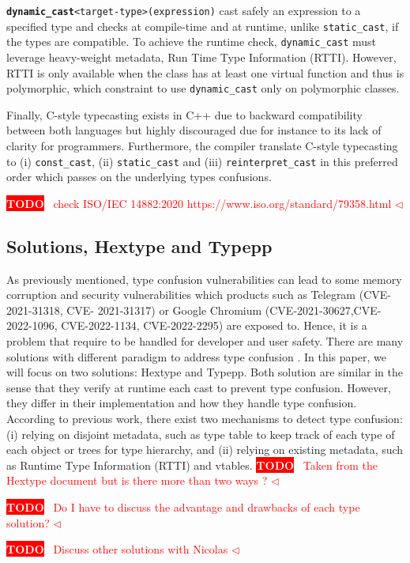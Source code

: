 \documentclass[a4paper,11pt,oneside]{report}
\newcommand{\todobox}[3]{%
       \colorbox{#1}{\textcolor{white}{\sffamily\bfseries\scriptsize #2}}%
       ~\textcolor{#1}{#3} %
       \textcolor{#1}{$\triangleleft$}%
}
\newcommand{\adrbqt}[1]{\todobox{red}{TODO}{#1}}
\begin{document}
\texttt{\textbf{dynamic\_cast}<target-type>(expression)} cast safely an expression to a specified type and checks at compile-time and at runtime, unlike \texttt{static\_cast}, if the types are compatible. 
To achieve the runtime check, \texttt{dynamic\_cast} must leverage heavy-weight metadata, Run Time Type Information (RTTI). However, RTTI is only available when the class has at least one virtual function 
and thus is polymorphic, which constraint to use \texttt{dynamic\_cast} only on polymorphic classes.

Finally, C-style typecasting exists in C++ due to backward compatibility between both languages but highly discouraged due for instance to its lack of clarity for programmers. 
Furthermore, the compiler translate C-style typecasting to (i) \texttt{const\_cast}, (ii) \texttt{static\_cast} and (iii) \texttt{reinterpret\_cast} in this preferred order which passes on the underlying types confusions.

\adrbqt{check ISO/IEC 14882:2020 https://www.iso.org/standard/79358.html}

\subsection{Solutions, Hextype and Typepp}

As previously mentioned, type confusion vulnerabilities can lead to some memory corruption and security vulnerabilities which products such as Telegram (CVE-2021-31318, CVE-
2021-31317) or Google Chromium (CVE-2021-30627,CVE-2022-1096, CVE-2022-1134, CVE-2022-2295) are exposed to. Hence, it is a problem that require to be handled for developer and user safety.
There are many solutions with different paradigm to address type confusion . In this paper, we will focus on two solutions: Hextype and Typepp.
Both solution are similar in the sense that they verify at runtime each cast to prevent type confusion. However, they differ in their implementation and how they handle type confusion.
According to previous work, there exist two mechanisms to detect type confusion: (i) relying on disjoint metadata, such as type table to keep track of each type of each object or trees for type hierarchy, and 
(ii) relying on existing metadata, such as Runtime Type Information (RTTI) and vtables. \adrbqt{Taken from the Hextype document but is there more than two ways ?}

\adrbqt{Do I have to discuss the advantage and drawbacks of each type solution?}

\adrbqt{Discuss other solutions with Nicolas}
\end{document}
